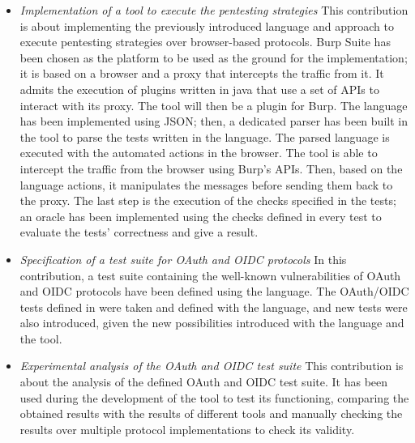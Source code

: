 \begin{itemize}
    \item \textit{Implementation of a tool to execute the pentesting strategies} This contribution is about implementing the previously introduced language and approach to execute pentesting strategies over browser-based protocols. Burp Suite has been chosen as the platform to be used as the ground for the implementation; it is based on a browser and a proxy that intercepts the traffic from it. It admits the execution of plugins written in java that use a set of APIs to interact with its proxy. The tool will then be a plugin for Burp. The language has been implemented using JSON; then, a dedicated parser has been built in the tool to parse the tests written in the language. The parsed language is executed with the automated actions in the browser. The tool is able to intercept the traffic from the browser using Burp's APIs. Then, based on the language actions, it manipulates the messages before sending them back to the proxy. The last step is the execution of the checks specified in the tests; an oracle has been implemented using the checks defined in every test to evaluate the tests' correctness and give a result.
    \item \textit{Specification of a test suite for OAuth and OIDC protocols} In this contribution, a test suite containing the well-known vulnerabilities of OAuth and OIDC protocols have been defined using the language. The OAuth/OIDC tests defined in \cite{claudio_grisenti, wendy_barreto} were taken and defined with the language, and new tests were also introduced, given the new possibilities introduced with the language and the tool.
    \item \textit{Experimental analysis of the OAuth and OIDC test suite} This contribution is about the analysis of the defined OAuth and OIDC test suite. It has been used during the development of the tool to test its functioning, comparing the obtained results with the results of different tools and manually checking the results over multiple protocol implementations to check its validity.
\end{itemize}


